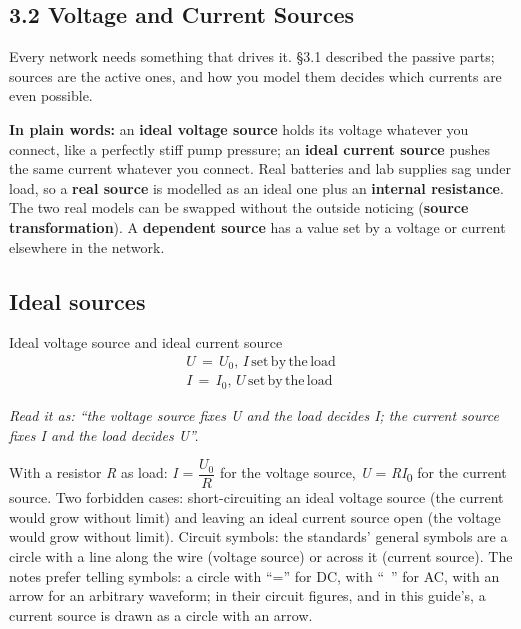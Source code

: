 \documentclass[11pt]{article}
\begin{document}
\begin{keepsection}
\section{3.2 Voltage and Current Sources}

Every network needs something that drives it. §3.1 described the passive parts; sources are the active ones, and how you model them decides which currents are even possible.

\begin{plainbox}\textbf{In plain words:} an \textbf{ideal voltage source} holds its voltage whatever you connect, like a perfectly stiff pump pressure; an \textbf{ideal current source} pushes the same current whatever you connect. Real batteries and lab supplies sag under load, so a \textbf{real source} is modelled as an ideal one plus an \textbf{internal resistance}. The two real models can be swapped without the outside noticing (\textbf{source transformation}). A \textbf{dependent source} has a value set by a voltage or current elsewhere in the network.\end{plainbox}

\begin{keepsection}
\subsection{Ideal sources}

\begin{equationcard}{Ideal voltage source and ideal current source}
\[ \begin{gathered} {U}\, =\, {U}_{0},\, {I}\, \text{set}\, \text{by}\, \text{the}\, \text{load} \\ {I}\, =\, {I}_{0},\, {U}\, \text{set}\, \text{by}\, \text{the}\, \text{load} \end{gathered} \]
{\small \emph{Read it as: “the voltage source fixes U and the load decides I; the current source fixes I and the load decides U”.}\par With a resistor \textit{R} as load: \textit{I} = {\small\ensuremath{\dfrac{{U}_{0}}{{R}}}} for the voltage source, \textit{U} = \textit{R}\textit{I}\textsubscript{0} for the current source. Two forbidden cases: short-circuiting an ideal voltage source (the current would grow without limit) and leaving an ideal current source open (the voltage would grow without limit). Circuit symbols: the standards’ general symbols are a circle with a line along the wire (voltage source) or across it (current source). The notes prefer telling symbols: a circle with “=” for DC, with “~” for AC, with an arrow for an arbitrary waveform; in their circuit figures, and in this guide’s, a current source is drawn as a circle with an arrow.}
\end{equationcard}
\end{keepsection}


\end{keepsection}
\end{document}
